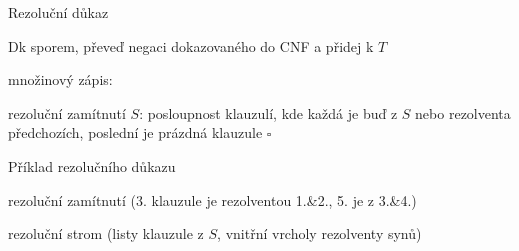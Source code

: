 \documentclass{beamer}
\begin{document}
\begin{frame}{Rezoluční důkaz}

    Dk sporem, převeď \alert{negaci} dokazovaného do CNF a přidej k $T$

    \pause


    \pause
    množinový zápis:

    \pause
    \medskip

    
    \pause
    \medskip

    \alert{rezoluční zamítnutí $S$}: posloupnost klauzulí, kde každá je buď z $S$ nebo rezolventa předchozích, poslední je prázdná klauzule $\square$

    \pause

\end{frame}


\begin{frame}{Příklad rezolučního důkazu}

    \alert{rezoluční zamítnutí} (3. klauzule je rezolventou 1.\&2., 5. je z 3.\&4.)


    \pause
    \bigskip

    \alert{rezoluční strom} (listy klauzule z $S$, vnitřní vrcholy rezolventy synů) 


\end{frame}
\end{document}
